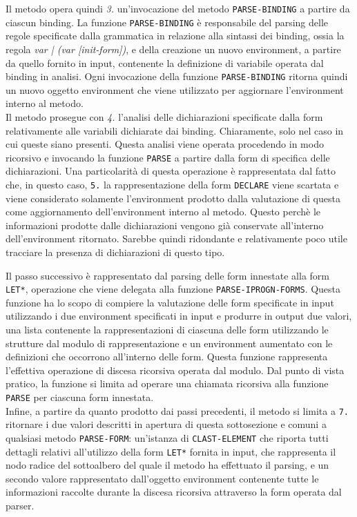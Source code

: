 Il metodo opera quindi \textit{3.} un’invocazione del metodo \texttt
{PARSE-BINDING} a partire da ciascun binding. La funzione \texttt
{PARSE-BINDING} è responsabile del parsing delle regole specificate dalla
grammatica in relazione alla sintassi dei binding, ossia la regola \textit
{var | (var [init-form])}, e della creazione un nuovo environment, a partire
da quello fornito in input, contenente la definizione di variabile operata dal
binding in analisi. Ogni invocazione della funzione \texttt{PARSE-BINDING}
ritorna quindi un nuovo oggetto environment che viene utilizzato per
aggiornare l’environment interno al metodo.\\

Il metodo prosegue con \textit{4.} l’analisi delle dichiarazioni specificate
dalla form relativamente alle variabili dichiarate dai binding. Chiaramente,
solo nel caso in cui queste siano presenti. Questa analisi viene operata
procedendo in modo ricorsivo e invocando la funzione \texttt{PARSE} a partire
dalla form di specifica delle dichiarazioni. Una particolarità di questa
operazione è rappresentata dal fatto che, in questo caso, \texttt{5.} la
rappresentazione della form \texttt{DECLARE} viene scartata e viene
considerato solamente l'environment prodotto dalla valutazione di questa come
aggiornamento dell'environment interno al metodo. Questo perchè le
informazioni prodotte dalle dichiarazioni vengono già conservate all'interno
dell'environment ritornato. Sarebbe quindi ridondante e relativamente poco
utile tracciare la presenza di dichiarazioni di questo tipo.

Il passo successivo è rappresentato dal parsing delle form innestate alla form
\texttt{LET*}, operazione che viene delegata alla funzione \texttt
{PARSE-IPROGN-FORMS}. Questa funzione ha lo scopo di compiere la valutazione
delle form specificate in input utilizzando i due environment specificati in
input e produrre in output due valori, una lista contenente la
rappresentazioni di ciascuna delle form utilizzando le strutture dal modulo di
rappresentazione e un environment aumentato con le definizioni che occorrono
all’interno delle form. Questa funzione rappresenta l'effettiva operazione di
discesa ricorsiva operata dal modulo. Dal punto di vista pratico, la funzione
si limita ad operare una chiamata ricorsiva alla funzione \texttt{PARSE} per
ciascuna form innestata.\\

Infine, a partire da quanto prodotto dai passi precedenti, il metodo si limita
a \texttt{7.} ritornare i due valori descritti in apertura di questa
sottosezione e comuni a qualsiasi metodo \texttt{PARSE-FORM}: un'istanza di
\texttt{CLAST-ELEMENT} che riporta tutti dettagli relativi all'utilizzo della
form \texttt{LET*} fornita in input, che rappresenta il nodo radice del
sottoalbero del quale il metodo ha effettuato il parsing, e un secondo valore
rappresentato dall'oggetto environment contenente tutte le informazioni
raccolte durante la discesa ricorsiva attraverso la form operata dal parser.\\

